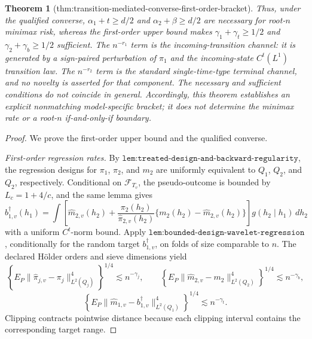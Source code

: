 \documentclass{article}
\newtheorem{theorem}{Theorem}
\begin{document}
\begin{theorem}[thm:transition-mediated-converse-first-order-bracket]
Thus, under the qualified converse, \(\alpha_1+t\ge d/2\) and \(\alpha_2+\beta\ge d/2\) are necessary for root-\(n\) minimax risk, whereas the first-order upper bound makes \(\gamma_1+\gamma_t\ge1/2\) and \(\gamma_2+\gamma_b\ge1/2\) sufficient. The \(n^{-r_1}\) term is the incoming-transition channel: it is generated by a sign-paired perturbation of \(\pi_1\) and the incoming-state \(C^t(L^1)\) transition law. The \(n^{-r_2}\) term is the standard single-time-type terminal channel, and no novelty is asserted for that component. The necessary and sufficient conditions do not coincide in general. Accordingly, this theorem establishes an explicit nonmatching model-specific bracket; it does not determine the minimax rate or a root-\(n\) if-and-only-if boundary.
\end{theorem}
\begin{proof}
We prove the first-order upper bound and the qualified converse.

\emph{First-order regression rates.} By \(\texttt{lem:treated-design-and-backward-regularity}\), the regression designs for \(\pi_1\), \(\pi_2\), and \(m_2\) are uniformly equivalent to \(Q_1\), \(Q_2\), and \(Q_2\), respectively. Conditional on \(\mathcal F_{T_v}\), the pseudo-outcome is bounded by \(L_c=1+4/c\), and the same lemma gives
\[b_{1,v}^\dagger(h_1)=\int\left[\widehat m_{2,v}(h_2)+\frac{\pi_2(h_2)}{\widehat\pi_{2,v}(h_2)}\{m_2(h_2)-\widehat m_{2,v}(h_2)\}\right]g(h_2\mid h_1)\,dh_2\]
with a uniform \(C^t\)-norm bound. Apply \(\texttt{lem:bounded-design-wavelet-regression}\), conditionally for the random target \(b_{1,v}^\dagger\), on folds of size comparable to \(n\). The declared H\"older orders and sieve dimensions yield
\[\left\{E_P\|\widehat\pi_{j,v}-\pi_j\|_{L^2(Q_j)}^4\right\}^{1/4}\lesssim n^{-\gamma_j},\qquad \left\{E_P\|\widehat m_{2,v}-m_2\|_{L^2(Q_2)}^4\right\}^{1/4}\lesssim n^{-\gamma_b},\]
\[\left\{E_P\|\widehat m_{1,v}-b_{1,v}^\dagger\|_{L^2(Q_1)}^4\right\}^{1/4}\lesssim n^{-\gamma_t}.\]
Clipping contracts pointwise distance because each clipping interval contains the corresponding target range.


\end{proof}
\end{document}
